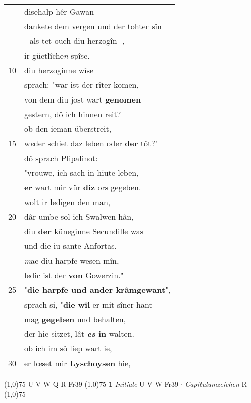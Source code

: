 \documentclass[8pt,a4paper,notitlepage]{article}
\begin{document}
\begin{table}[ht]
\begin{minipage}[t]{0.5\linewidth}
\begin{tabular}{rl}
 & disehalp hêr Gawan\\ 
 & dankete dem vergen und der tohter sîn\\ 
 & - als tet ouch diu herzogîn -,\\ 
 & ir güetlîche\textit{n} spîse.\\ 
10 & diu herzoginne wîse\\ 
 & sprach: "war ist der rîter komen,\\ 
 & von dem diu jost wart \textbf{genomen}\\ 
 & gestern, dô ich hinnen reit?\\ 
 & ob den ieman überstreit,\\ 
15 & w\textit{e}der schiet daz leben oder \textbf{der} tôt?"\\ 
 & dô sprach Plipalinot:\\ 
 & "vrouwe, ich sach in hiute leben,\\ 
 & \textbf{er} wart mir vür \textbf{diz} ors gegeben.\\ 
 & wolt ir ledigen den man,\\ 
20 & dâr umbe sol ich Swalwen hân,\\ 
 & diu \textbf{der} küneginne Secundille was\\ 
 & und die iu sante Anfortas.\\ 
 & \textit{m}ac diu harpfe wesen mîn,\\ 
 & ledic ist der \textbf{von} Gowerzin."\\ 
25 & "\textbf{die harpfe und ander krâmgewant}",\\ 
 & sprach si, "\textbf{die wîl} er mit sîner hant\\ 
 & mag \textbf{gegeben} und behalten,\\ 
 & der hie sitzet, lât \textbf{\textit{es} in} walten.\\ 
 & ob ich im sô liep wart ie,\\ 
30 & er lœset mir \textbf{Lyschoysen} hie,\\ 
\end{tabular}
\scriptsize
\line(1,0){75} \newline
U V W Q R Fr39 \newline
\line(1,0){75} \newline
\textbf{1} \textit{Initiale} U V W Fr39   $\cdot$ \textit{Capitulumzeichen} R  \newline
\line(1,0){75} \newline

\end{minipage}
\end{table}
\end{document}
